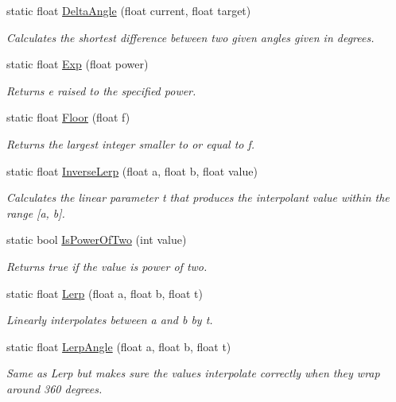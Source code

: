 \begin{DoxyCompactItemize}
static float \mbox{\hyperlink{class_lua_1_1_mathf_aad5844ff29ce4955f86e72b701cf871b}{Delta\+Angle}} (float current, float target)
\begin{DoxyCompactList}\small\item\em Calculates the shortest difference between two given angles given in degrees. \end{DoxyCompactList}\item 
static float \mbox{\hyperlink{class_lua_1_1_mathf_a2bde76bb17351b51bc55e2d65f8e9263}{Exp}} (float power)
\begin{DoxyCompactList}\small\item\em Returns e raised to the specified power. \end{DoxyCompactList}\item 
static float \mbox{\hyperlink{class_lua_1_1_mathf_a72fc411403ab2b7e87ffd6e3989bc9e4}{Floor}} (float f)
\begin{DoxyCompactList}\small\item\em Returns the largest integer smaller to or equal to f. \end{DoxyCompactList}\item 
static float \mbox{\hyperlink{class_lua_1_1_mathf_a4344694ab95eb4dc13046b0798a88ff3}{Inverse\+Lerp}} (float a, float b, float value)
\begin{DoxyCompactList}\small\item\em Calculates the linear parameter t that produces the interpolant value within the range \mbox{[}a, b\mbox{]}. \end{DoxyCompactList}\item 
static bool \mbox{\hyperlink{class_lua_1_1_mathf_a44aca0d32ffbf1de0925f05b65d94032}{Is\+Power\+Of\+Two}} (int value)
\begin{DoxyCompactList}\small\item\em Returns true if the value is power of two. \end{DoxyCompactList}\item 
static float \mbox{\hyperlink{class_lua_1_1_mathf_a659f0bf0690e5056165eb8bd958d6751}{Lerp}} (float a, float b, float t)
\begin{DoxyCompactList}\small\item\em Linearly interpolates between a and b by t. \end{DoxyCompactList}\item 
static float \mbox{\hyperlink{class_lua_1_1_mathf_a2363a79cc48061f10c4e7e1b47df2538}{Lerp\+Angle}} (float a, float b, float t)
\begin{DoxyCompactList}\small\item\em Same as Lerp but makes sure the values interpolate correctly when they wrap around 360 degrees. \end{DoxyCompactList}\item 

\end{DoxyCompactItemize}
